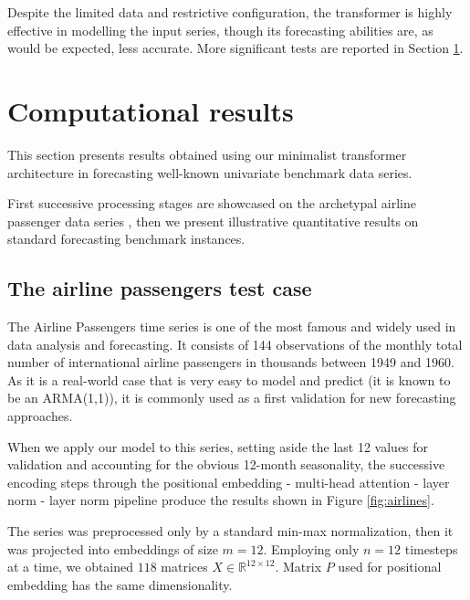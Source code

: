 \documentclass[algorithms,article,submit,pdftex,moreauthors]{Definitions/mdpi}
\begin{document}
Despite the limited data and restrictive configuration, the transformer is highly effective in modelling the input series, though its forecasting abilities are, as would be expected, less accurate. More significant tests are reported in Section \ref{sec:results}.

\section{Computational results} \label{sec:results}

This section presents results obtained using our minimalist transformer architecture in forecasting well-known univariate benchmark data series.

First successive processing stages are showcased on the archetypal airline passenger data series \citep{BJ70}, then we present illustrative quantitative results on standard forecasting benchmark instances.

\subsection{The airline passengers test case} \label{subsec:airlines}

The Airline Passengers time series is one of the most famous and widely used in data analysis and forecasting. It consists of 144 observations of the monthly total number of international airline passengers in thousands between 1949 and 1960. As it is a real-world case that is very easy to model and predict (it is known to be an ARMA(1,1)), it is commonly used as a first validation for new forecasting approaches.

When we apply our model to this series, setting aside the last 12 values for validation and accounting for the obvious 12-month seasonality, the successive encoding steps through the positional embedding - multi-head attention - layer norm - layer norm pipeline produce the results shown in Figure \ref{fig:airlines}.

The series was preprocessed only by a standard min-max normalization, then it was projected into embeddings of size $m = 12$. Employing only $n = 12$ timesteps at a time, we obtained $118$ matrices $X \in \mathbb{R}^{12 \times 12}$. Matrix $P$ used for positional embedding has the same dimensionality.
\end{document}
